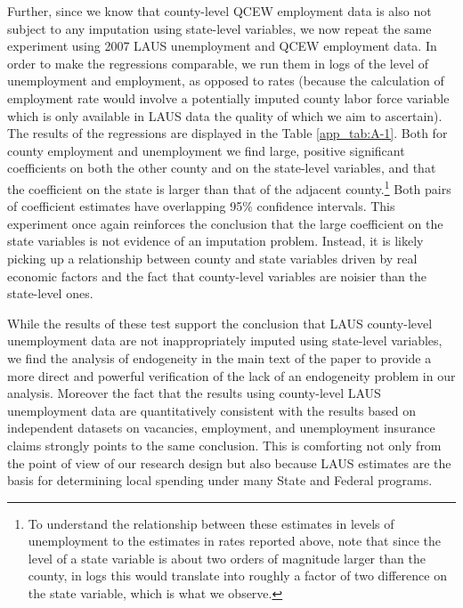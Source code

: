 \documentclass[12pt]{article}
\newcommand{\1}{\mathbf{1}}
\begin{document}
\begin{appendix}
Further, since we know that county-level QCEW employment data is also not subject to any imputation using state-level variables, we now repeat the same experiment using 2007 LAUS unemployment and QCEW employment data.  In order to make the regressions comparable, we run them in logs of the level of unemployment and employment, as opposed to rates (because the calculation of employment rate would involve a potentially imputed county labor force variable which is only available in LAUS data the quality of which we aim to ascertain). The results of the regressions are displayed in the Table \ref{app_tab:A-1}. Both for county employment and unemployment we find large, positive significant coefficients on both the other county and on the state-level variables, and that the coefficient on the state is larger than that of the adjacent county.\footnote{To understand the relationship between these estimates in levels of unemployment to the estimates in rates reported above, note that since the level of a state variable is about two orders of magnitude larger than the county, in logs this would translate into roughly a factor of two difference on the state variable, which is what we observe.} Both pairs of coefficient estimates have overlapping 95\% confidence intervals. This experiment once again reinforces the conclusion that the large coefficient on the state variables is not evidence of an imputation problem. Instead, it is likely picking up a relationship between county and state variables driven by real economic factors and the fact that county-level variables are noisier than the state-level ones.

\begin{table}
  \centering
  \caption{County Unemployment and Employment as a Function of Pair County and State}\label{app_tab:A-1}

\vspace{-0.2cm}
\end{table}

While the results of these test support the conclusion that LAUS county-level unemployment data are not inappropriately imputed using state-level variables, we find the analysis of endogeneity in the main text of the paper to provide a more direct and powerful verification of the lack of an endogeneity problem in our analysis. Moreover the fact that the results using county-level LAUS unemployment data are quantitatively consistent with the results based on independent datasets on vacancies, employment, and unemployment insurance claims strongly points to the same conclusion. This is comforting not only from the point of view of our research design but also because LAUS estimates are the basis for determining local spending under many State and Federal programs.





\end{appendix}
\end{document}

